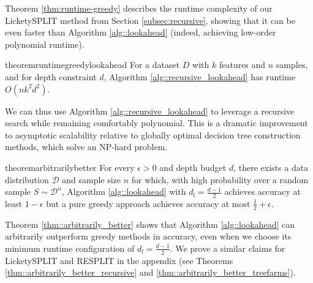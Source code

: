 Theorem \ref{thm:runtime-greedy} describes the runtime complexity of our LicketySPLIT method from Section \ref{subsec:recursive}, showing that it can be even faster than Algorithm \ref{alg::lookahead} (indeed, achieving low-order polynomial runtime). 

\begin{restatable}{theorem}{runtimegreedylookahead}
\label{thm:runtime-greedy}
    For a dataset $D$ with $k$ features and $n$ samples, and for depth constraint $d$, Algorithm \ref{alg::recursive_lookahead} has runtime $O(nk^2d^2)$.
\end{restatable}

We can thus use Algorithm \ref{alg::recursive_lookahead} to leverage a recursive search while remaining comfortably polynomial. This is a dramatic improvement to asymptotic scalability relative to globally optimal decision tree construction methods, which solve an NP-hard problem. 

\begin{restatable}{theorem}{arbitrarilybetter}
    \label{thm::arbitrarily_better}
    For every $\epsilon > 0$ and depth budget $d$, there exists a data distribution $\mathcal{D}$ and sample size $n$ for which, with high probability over a random sample $S \sim \mathcal{D}^n$, Algorithm \ref{alg::lookahead} with $d_l = \frac{d-1}{2}$ achieves accuracy at least $1-\epsilon$ but a pure greedy approach achieves accuracy at most $\frac{1}{2} + \epsilon$.
\end{restatable}

Theorem \ref{thm::arbitrarily_better} shows that Algorithm \ref{alg::lookahead} can arbitrarily outperform greedy methods in accuracy, even when we choose its minimum runtime configuration of $d_l = \frac{d-1}{2}$. We prove a similar claims for LicketySPLIT and RESPLIT in the appendix (see Theorems \ref{thm::arbitrarily_better_recursive} and \ref{thm::arbitrarily_better_treefarms}). 
